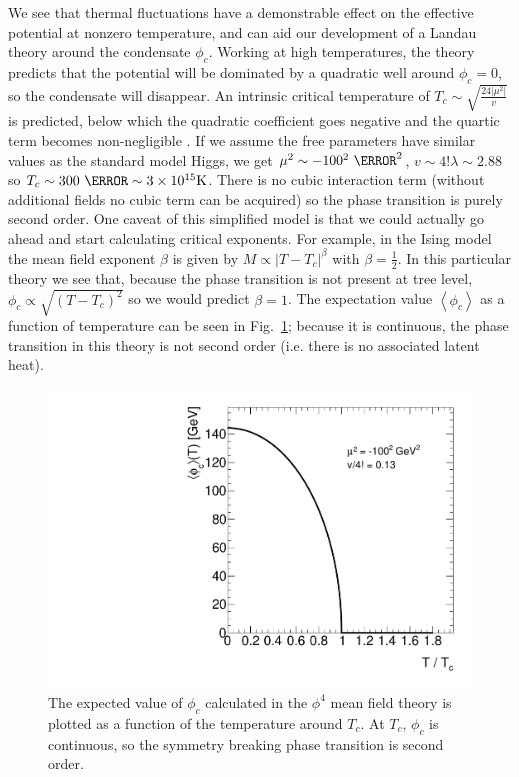 \documentclass[%
 reprint,
nofootinbib,
 amsmath,amssymb,
 aps,
floatfix,
]{revtex4-1}
\begin{document}
We see that thermal fluctuations have a demonstrable effect on the effective potential at nonzero temperature, and can aid our development of a Landau theory around the condensate $\phi_c$.
Working at high temperatures, the theory predicts that the potential will be dominated by a quadratic well around $\phi_c = 0$, so the condensate will disappear.
An intrinsic critical temperature of $T_c \sim \sqrt{\frac{24|\mu^2|}{v}}$ is predicted, below which the quadratic coefficient goes negative and the quartic term becomes non-negligible \cite{linde05}.
If we assume the free parameters have similar values as the standard model Higgs, we get $\mu^2 \sim -100^2~\GeV^2$, $v \sim 4!\lambda \sim 2.88$ so $T_c \sim 300~\GeV \sim 3 \times 10^{15} \text{K}$.
There is no cubic interaction term (without additional fields no cubic term can be acquired) so the phase transition is purely second order.
One caveat of this simplified model is that we could actually go ahead and start calculating critical exponents.
For example, in the Ising model the mean field exponent $\beta$ is given by $M \propto \left|T-T_c\right|^\beta$ with $\beta=\frac{1}{2}$.
In this particular theory we see that, because the phase transition is not present at tree level,
$\phi_c \propto \sqrt{\left(T-T_c\right)^2}$ so we would predict $\beta=1$.
The expectation value $\left<\phi_c\right>$ as a function of temperature can be seen in Fig.~\ref{fig:expectval}; because it is continuous, the phase transition in this theory is not second order (i.e. there is no associated latent heat).
\begin{figure}
    \centering
    \includegraphics[width=\linewidth]{scalarFieldExpectationValue.pdf}
    \caption{The expected value of $\phi_c$ calculated in the $\phi^4$ mean field theory is plotted as a function of the temperature around $T_c$. At $T_c$, $\phi_c$ is continuous, so the symmetry breaking phase transition is second order.}
    \label{fig:expectval}
\end{figure}
\end{document}
